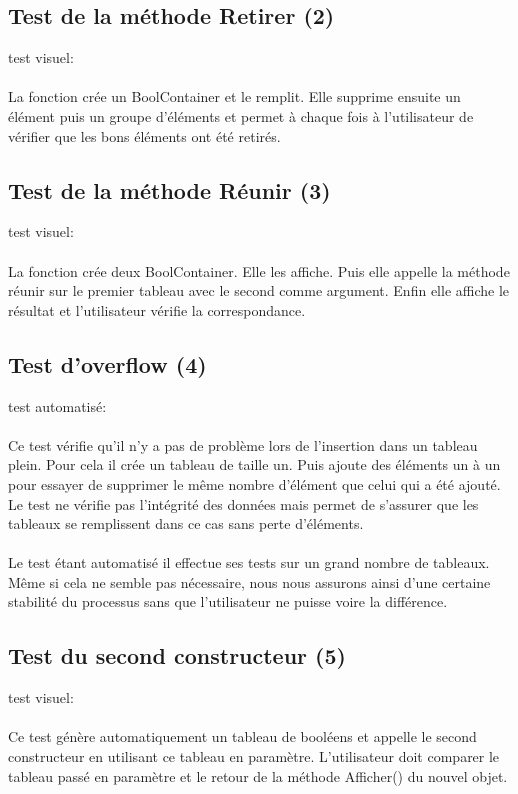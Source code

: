\documentclass[a4paper, 12pts]{article}
\begin{document}
\subsection{Test de la méthode Retirer (2)}
test visuel:
\paragraph{}
La fonction crée un BoolContainer et le remplit. Elle supprime ensuite un élément puis un groupe d’éléments et permet à chaque fois à l’utilisateur de vérifier que les bons éléments ont été retirés.

\subsection{Test de la méthode Réunir (3)}
test visuel:
\paragraph{}
La fonction crée deux BoolContainer. Elle les affiche. Puis elle appelle la méthode réunir sur le premier tableau avec le second comme argument. Enfin elle affiche le résultat et l’utilisateur vérifie la correspondance.

\subsection{Test d'overflow (4)}
test automatisé:
\paragraph{}
Ce test vérifie qu'il n'y a pas de problème lors de l'insertion dans un tableau plein. Pour cela il crée un tableau de taille un. Puis ajoute des éléments un à un pour essayer de supprimer le même nombre d’élément que celui qui a été ajouté. Le test ne vérifie pas l’intégrité des données mais permet de s'assurer que les tableaux se remplissent dans ce cas sans perte d'éléments.
\paragraph{}
Le test étant automatisé il effectue ses tests sur un grand nombre de tableaux. Même si cela ne semble pas nécessaire, nous nous assurons ainsi d'une certaine stabilité du processus sans que l'utilisateur ne puisse voire la différence.

\subsection{Test du second constructeur (5)}
test visuel:
\paragraph{}
Ce test génère automatiquement un tableau de booléens et appelle le second constructeur en utilisant ce tableau en paramètre. L'utilisateur doit comparer le tableau passé en paramètre et le retour de la méthode Afficher() du nouvel objet.
\end{document}
